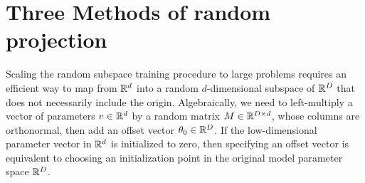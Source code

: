 \documentclass{article} %
\begin{document}




\section{Three Methods of random projection}

\newcommand{\bigO}{\mathcal{O}}

Scaling the random subspace training procedure to large problems requires an efficient way to map from $\mathbb{R}^d$ into a random $d$-dimensional subspace of $\mathbb{R}^D$ that does not necessarily include the origin. Algebraically, we need to left-multiply a vector of parameters $v \in \mathbb{R}^d$ by a random matrix $M \in \mathbb{R}^{D \times d}$, whose columns are orthonormal, then add an offset vector $\theta_0 \in \mathbb{R}^D$. If the low-dimensional parameter vector in $\mathbb{R}^d$ is initialized to zero, then specifying an offset vector is equivalent to choosing an initialization point in the original model parameter space $\mathbb{R}^D$.
\end{document}
